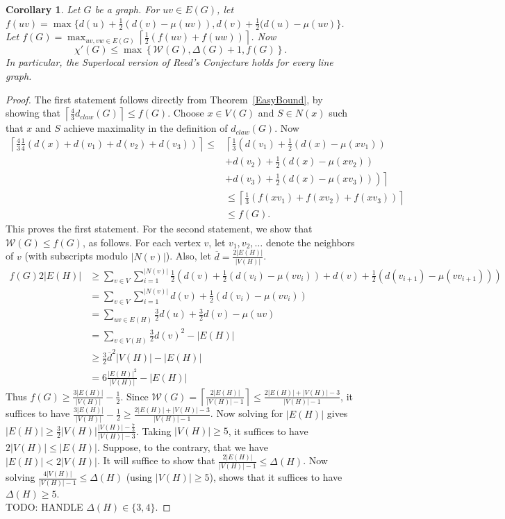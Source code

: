 \documentclass[12pt]{amsart}
\theoremstyle{plain}
\newtheorem{cor}[thm]{Corollary}
\theoremstyle{definition}
\theoremstyle{remark}
\newcommand{\fancy}[1]{\mathcal{#1}}
\newcommand{\W}{\fancy{W}}
\newcommand{\set}[1]{\left\{ #1 \right\}}
\newcommand{\ceil}[1]{\left\lceil#1\right\rceil}
\begin{document}
\begin{cor}
\label{SuperlocalReedCor}
Let $G$ be a graph.  For $uv\in E(G)$, let
$f(uv)=\max\{d(u)+\frac12(d(v)-\mu(uv)),d(v)+\frac12(d(u)-\mu(uv)\}$.  Let
$f(G)=\max_{uv,vw\in E(G)}\ceil{\frac12(f(uv)+f(uw))}$.  Now 
\[\chi'(G) \le \max\set{\W(G), \Delta(G) + 1, f(G)}.\]
In particular, the Superlocal version of Reed's Conjecture holds for every line
graph.
\end{cor}
\begin{proof}
The first statement follows directly from Theorem~\ref{EasyBound}, by showing that
$\ceil{\frac43d_{claw}(G)}\le f(G)$.  Choose $x\in V(G)$ and $S\in N(x)$ such
that $x$ and $S$ achieve maximality in the definition of $d_{claw}(G)$.
Now 
\begin{align*}
\ceil{\frac43\frac14(d(x)+d(v_1)+d(v_2)+d(v_3))} \le&
\left\lceil\frac13\left( 
d(v_1)+\frac12(d(x)-\mu(xv_1))\right.\right.\\
&+d(v_2)+\frac12(d(x)-\mu(xv_2))\\
&\left.\left.+d(v_3)+\frac12(d(x)-\mu(xv_3))\right)\right\rceil\\
&\le \ceil{\frac13(f(xv_1)+f(xv_2)+f(xv_3))}\\
&\le f(G).
\end{align*}
This proves the first statement.  For the second statement, we show that
$\W(G)\le f(G)$, as follows.  For each vertex $v$, let $v_1, v_2,\ldots$ denote
the neighbors of $v$ (with subscripts modulo $|N(v)|$).  Also, let
$\overline{d}=\frac{2|E(H)|}{|V(H)|}$.
\begin{align*}
f(G)2|E(H)| &\ge \sum_{v\in
V}\sum_{i=1}^{|N(v)|}\frac12(d(v)+\frac12(d(v_i)-\mu(vv_i))+d(v)+\frac12(d(v_{i+1})-\mu(vv_{i+1})))\\
 &= \sum_{v\in
V}\sum_{i=1}^{|N(v)|}d(v)+\frac12(d(v_i)-\mu(vv_i))\\
& = \sum_{uv\in E(H)}\frac32d(u)+\frac32d(v)-\mu(uv) \\
& = \sum_{v\in V(H)}\frac32d(v)^2 - |E(H)|\\
& \ge \frac32\overline{d}^2|V(H)|-|E(H)|\\
& = 6\frac{|E(H)|^2}{|V(H)|}-|E(H)|
\end{align*}
Thus $f(G)\ge \frac{3|E(H)|}{|V(H)|}-\frac12$.
Since $\W(G)=\ceil{\frac{2|E(H)|}{|V(H)|-1}}\le
\frac{2|E(H)|+|V(H)|-3}{|V(H)|-1}$, 
it suffices to have 
$\frac{3|E(H)|}{|V(H)|}-\frac12 \ge \frac{2|E(H)|+|V(H)|-3}{|V(H)|-1}$. 
Now solving for $|E(H)|$
gives $|E(H)|\ge \frac32|V(H)|\frac{|V(H)|-\frac73}{|V(H)|-3}$.  Taking
$|V(H)|\ge 5$, it suffices to have $2|V(H)|\le |E(H)|$.  Suppose, to the
contrary, that we have $|E(H)|<2|V(H)|$.  It will suffice to show that
$\frac{2|E(H)|}{|V(H)|-1}\le \Delta(H)$.  Now solving
$\frac{4|V(H)|}{|V(H)|-1}\le \Delta(H)$ (using $|V(H)|\ge 5$), shows that it
suffices to have $\Delta(H)\ge 5$.\\
TODO: HANDLE $\Delta(H)\in\{3,4\}$.
\end{proof}
\end{document}
